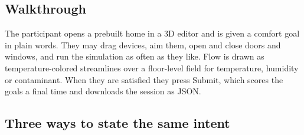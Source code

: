 \documentclass[manuscript,review,anonymous]{acmart}
\begin{document}

\subsection{Walkthrough}

The participant opens a prebuilt home in a 3D editor and is given a comfort goal
in plain words. They may drag devices, aim them, open and close doors and
windows, and run the simulation as often as they like. Flow is drawn as
temperature-colored streamlines over a floor-level field for temperature,
humidity or contaminant. When they are satisfied they press Submit, which scores
the goals a final time and downloads the session as JSON.

\subsection{Three ways to state the same intent}
\end{document}
